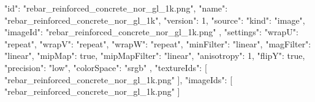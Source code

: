 {
  "id": "rebar_reinforced_concrete_nor_gl_1k.png",
  "name": "rebar_reinforced_concrete_nor_gl_1k",
  "version": 1,
  "source": {
    "kind": "image",
    "imageId": "rebar_reinforced_concrete_nor_gl_1k.png"
  },
  "settings": {
    "wrapU": "repeat",
    "wrapV": "repeat",
    "wrapW": "repeat",
    "minFilter": "linear",
    "magFilter": "linear",
    "mipMap": true,
    "mipMapFilter": "linear",
    "anisotropy": 1,
    "flipY": true,
    "precision": "low",
    "colorSpace": "srgb"
  },
  "textureIds": [
    "rebar_reinforced_concrete_nor_gl_1k.png"
  ],
  "imageIds": [
    "rebar_reinforced_concrete_nor_gl_1k.png"
  ]
}
